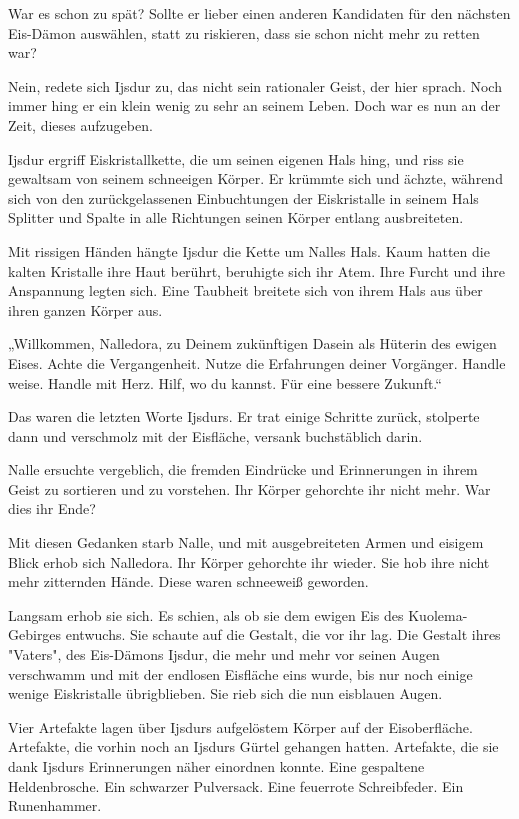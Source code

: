 War es schon zu spät? Sollte er lieber einen anderen Kandidaten für den nächsten Eis-Dämon auswählen, statt zu riskieren, dass sie schon nicht mehr zu retten war?

Nein, redete sich Ijsdur zu, das nicht sein rationaler Geist, der hier sprach. Noch immer hing er ein klein wenig zu sehr an seinem Leben. Doch war es nun an der Zeit, dieses aufzugeben.

Ijsdur ergriff Eiskristallkette, die um seinen eigenen Hals hing, und riss sie gewaltsam von seinem schneeigen Körper. Er krümmte sich und ächzte, während sich von den zurückgelassenen Einbuchtungen der Eiskristalle in seinem Hals Splitter und Spalte in alle Richtungen seinen Körper entlang ausbreiteten.

Mit rissigen Händen hängte Ijsdur die Kette um Nalles Hals. Kaum hatten die kalten Kristalle ihre Haut berührt, beruhigte sich ihr Atem. Ihre Furcht und ihre Anspannung legten sich. Eine Taubheit breitete sich von ihrem Hals aus über ihren ganzen Körper aus.

„Willkommen, Nalledora, zu Deinem zukünftigen Dasein als Hüterin des ewigen Eises. Achte die Vergangenheit. Nutze die Erfahrungen deiner Vorgänger. Handle weise. Handle mit Herz. Hilf, wo du kannst. Für eine bessere Zukunft.“

Das waren die letzten Worte Ijsdurs. Er trat einige Schritte zurück, stolperte dann und verschmolz mit der Eisfläche, versank buchstäblich darin.

Nalle ersuchte vergeblich, die fremden Eindrücke und Erinnerungen in ihrem Geist zu sortieren und zu vorstehen. Ihr Körper gehorchte ihr nicht mehr. War dies ihr Ende?

Mit diesen Gedanken starb Nalle, und mit ausgebreiteten Armen und eisigem Blick erhob sich Nalledora. Ihr Körper gehorchte ihr wieder. Sie hob ihre nicht mehr zitternden Hände. Diese waren schneeweiß geworden.

Langsam erhob sie sich. Es schien, als ob sie dem ewigen Eis des Kuolema-Gebirges entwuchs. Sie schaute auf die Gestalt, die vor ihr lag. Die Gestalt ihres "Vaters", des Eis-Dämons Ijsdur, die mehr und mehr vor seinen Augen verschwamm und mit der endlosen Eisfläche eins wurde, bis nur noch einige wenige Eiskristalle übrigblieben. Sie rieb sich die nun eisblauen Augen.

Vier Artefakte lagen über Ijsdurs aufgelöstem Körper auf der Eisoberfläche. Artefakte, die vorhin noch an Ijsdurs Gürtel gehangen hatten. Artefakte, die sie dank Ijsdurs Erinnerungen näher einordnen konnte. Eine gespaltene Heldenbrosche. Ein schwarzer Pulversack. Eine feuerrote Schreibfeder. Ein Runenhammer.

